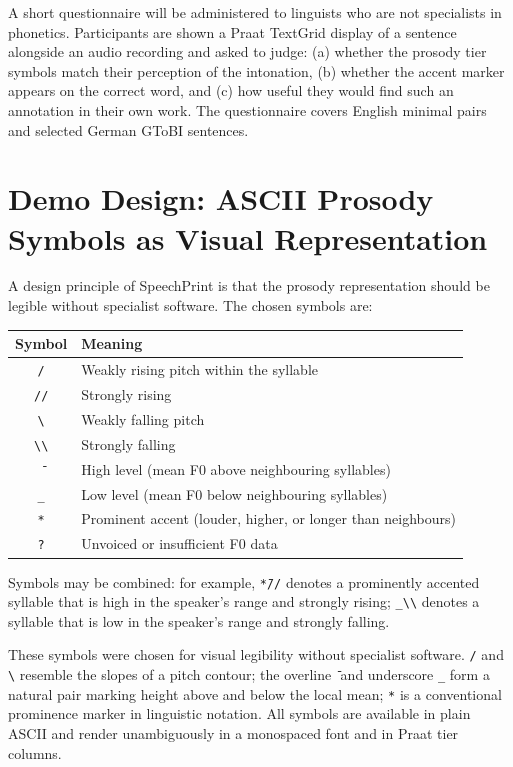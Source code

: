 A short questionnaire will be administered to linguists who are not specialists
in phonetics. Participants are shown a Praat TextGrid display of a sentence
alongside an audio recording and asked to judge: (a) whether the prosody tier
symbols match their perception of the intonation, (b) whether the accent marker
appears on the correct word, and (c) how useful they would find such an
annotation in their own work. The questionnaire covers English minimal pairs and
selected German GToBI sentences.

\section{Demo Design: ASCII Prosody Symbols as Visual Representation}
\label{sec:demo_design}

A design principle of SpeechPrint is that the prosody representation should be
legible without specialist software. The chosen symbols are:

\begin{center}
\begin{tabular}{cl}
\hline
Symbol & Meaning \\
\hline
\texttt{/}  & Weakly rising pitch within the syllable \\
\texttt{//} & Strongly rising \\
\texttt{\textbackslash}  & Weakly falling pitch \\
\texttt{\textbackslash\textbackslash} & Strongly falling \\
\texttt{{\={}}} & High level (mean F0 above neighbouring syllables) \\
\texttt{\_} & Low level (mean F0 below neighbouring syllables) \\
\texttt{*}  & Prominent accent (louder, higher, or longer than neighbours) \\
\texttt{?}  & Unvoiced or insufficient F0 data \\
\hline
\end{tabular}
\end{center}

Symbols may be combined: for example, \texttt{*{\={}}//} denotes a prominently
accented syllable that is high in the speaker's range and strongly rising; \texttt{\_\textbackslash\textbackslash}
denotes a syllable that is low in the speaker's range and strongly falling.

These symbols were chosen for visual legibility without specialist software.
\texttt{/} and \texttt{\textbackslash} resemble the slopes of a pitch contour;
the overline \texttt{{\={}}} and underscore \texttt{\_} form a natural pair
marking height above and below the local mean; \texttt{*} is a conventional
prominence marker in linguistic notation. All symbols are available in plain
ASCII and render unambiguously in a monospaced font and in Praat tier columns.

